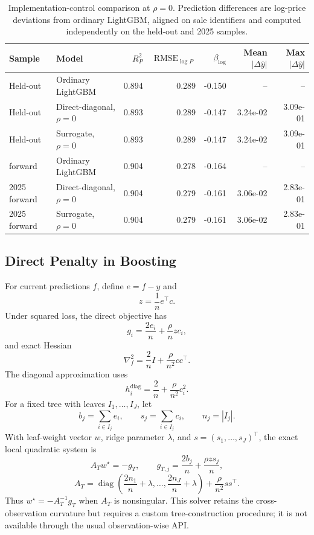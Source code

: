 \documentclass[10pt]{article}
\theoremstyle{definition}
\newcommand{\diag}{\operatorname{diag}}
\newcommand{\1}{\mathbf{1}}
\begin{document}
{
\begin{table}[!ht]
\centering
\caption{Implementation-control comparison at $\rho=0$. Prediction differences are log-price deviations from ordinary LightGBM, aligned on sale identifiers and computed independently on the held-out and 2025 samples.}
\label{tab:rho_zero_control}
\begin{tabular}{llrrrrr}
\toprule
Sample & Model & $R^2_P$ & $\operatorname{RMSE}_{\log P}$ & $\beta_{\log}$ & Mean $|\Delta\widehat y|$ & Max $|\Delta\widehat y|$ \\
\midrule
Held-out & Ordinary LightGBM & 0.894 & 0.289 & -0.150 & -- & -- \\
Held-out & Direct-diagonal, $\rho=0$ & 0.893 & 0.289 & -0.147 & 3.24e-02 & 3.09e-01 \\
Held-out & Surrogate, $\rho=0$ & 0.893 & 0.289 & -0.147 & 3.24e-02 & 3.09e-01 \\
\addlinespace
2025 forward & Ordinary LightGBM & 0.904 & 0.278 & -0.164 & -- & -- \\
2025 forward & Direct-diagonal, $\rho=0$ & 0.904 & 0.279 & -0.161 & 3.06e-02 & 2.83e-01 \\
2025 forward & Surrogate, $\rho=0$ & 0.904 & 0.279 & -0.161 & 3.06e-02 & 2.83e-01 \\
\bottomrule
\end{tabular}
\end{table}
}


\subsection{Direct Penalty in Boosting}

For current predictions $f$, define $e=f-y$ and
\[
z=\frac{1}{n}e^\top c.
\]
Under squared loss, the direct objective has
\[
g_i=\frac{2e_i}{n}+\frac{\rho}{n}zc_i,
\]
and exact Hessian
\[
\nabla_f^2
=
\frac{2}{n}I+\frac{\rho}{n^2}cc^\top.
\]
The diagonal approximation uses
\[
h_i^{\mathrm{diag}}
=
\frac{2}{n}+\frac{\rho}{n^2}c_i^2.
\]
For a fixed tree with leaves $I_1,\ldots,I_J$, let
\[
b_j=\sum_{i\in I_j}e_i,
\qquad
s_j=\sum_{i\in I_j}c_i,
\qquad
n_j=|I_j|.
\]
With leaf-weight vector $w$, ridge parameter $\lambda$, and $s=(s_1,\ldots,s_J)^\top$, the exact local quadratic system is
\[
A_Tw^\star=-g_T,
\qquad
g_{T,j}=\frac{2b_j}{n}+\frac{\rho z s_j}{n},
\]
\[
A_T
=
\diag\!\left(\frac{2n_1}{n}+\lambda,\ldots,\frac{2n_J}{n}+\lambda\right)
+\frac{\rho}{n^2}ss^\top.
\]
Thus $w^\star=-A_T^{-1}g_T$ when $A_T$ is nonsingular. This solver retains the cross-observation curvature but requires a custom tree-construction procedure; it is not available through the usual observation-wise API.
\end{document}
